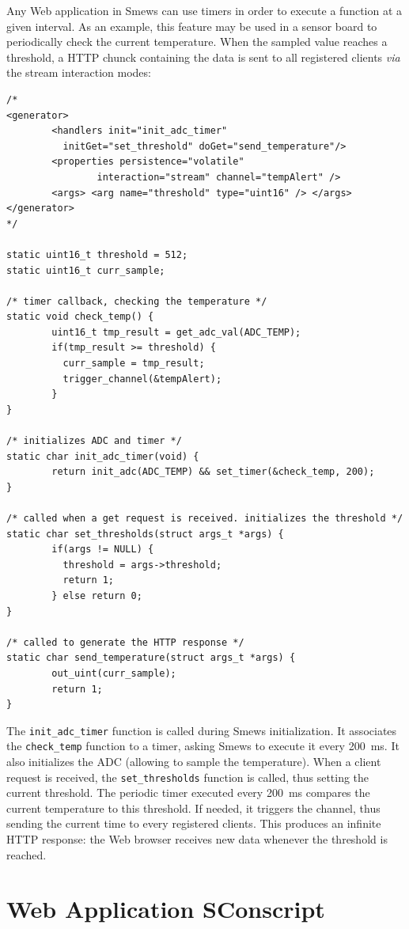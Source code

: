 \documentclass{report}
\begin{document}
Any Web application in Smews can use timers in order to execute a function at a given interval. As an example, this feature may be used in a sensor board to periodically check the current temperature. When the sampled value reaches a threshold, a HTTP chunck containing the data is sent to all registered clients {\it via} the stream interaction modes:
\lstset{language=C}
\begin{lstlisting}
/*
<generator>
        <handlers init="init_adc_timer"
	      initGet="set_threshold" doGet="send_temperature"/>
        <properties persistence="volatile"
                interaction="stream" channel="tempAlert" />
        <args> <arg name="threshold" type="uint16" /> </args>
</generator>
*/

static uint16_t threshold = 512;
static uint16_t curr_sample;

/* timer callback, checking the temperature */
static void check_temp() {
        uint16_t tmp_result = get_adc_val(ADC_TEMP);
        if(tmp_result >= threshold) {
	      curr_sample = tmp_result;
	      trigger_channel(&tempAlert);
        }
}

/* initializes ADC and timer */
static char init_adc_timer(void) {
        return init_adc(ADC_TEMP) && set_timer(&check_temp, 200);
}

/* called when a get request is received. initializes the threshold */
static char set_thresholds(struct args_t *args) {
        if(args != NULL) {
	      threshold = args->threshold;
	      return 1;
        } else return 0;
}

/* called to generate the HTTP response */
static char send_temperature(struct args_t *args) {
        out_uint(curr_sample);
        return 1;
}
\end{lstlisting}

The \verb+init_adc_timer+ function is called during Smews initialization. It associates the \verb+check_temp+ function to a timer, asking Smews to execute it every 200~ms. It also initializes the ADC (allowing to sample the temperature). When a client request is received, the \verb+set_thresholds+ function is called, thus setting the current threshold. The periodic timer executed every 200~ms compares the current temperature to this threshold. If needed, it triggers the channel, thus sending the current time to every registered clients. This produces an infinite HTTP response: the Web browser receives new data whenever the threshold is reached.

\section{Web Application SConscript}
\end{document}
